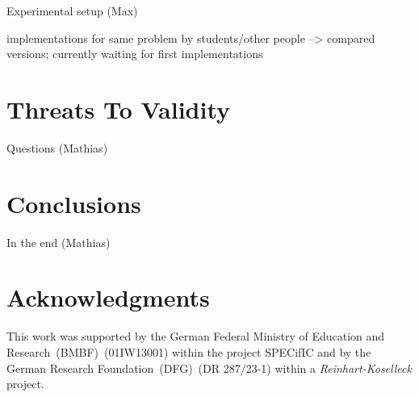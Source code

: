 \documentclass[conference]{IEEEtran}
\begin{document}
\danger Experimental setup (Max)

\danger implementations for same problem by students/other people --> compared
versions; currently waiting for first implementations

\section{Threats To Validity}
\label{sec:threats-validity}

\danger Questions (Mathias)

\section{Conclusions}
\label{sec:conclusions}

\danger In the end (Mathias)

\section*{Acknowledgments}
\label{sec:acknowledgments}
This work was supported by the German Federal Ministry of Education and
Research~(BMBF)~(01IW13001) within the project SPECifIC and by the German
Research Foundation~(DFG)~(DR 287/23-1) within a \emph{Reinhart-Koselleck}
project.


%
%
\end{document}
